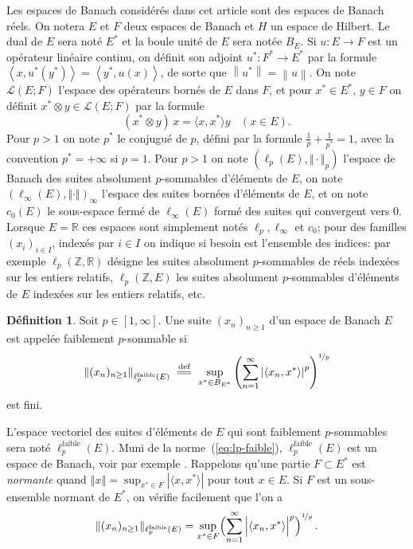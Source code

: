 \documentclass{smfart}
\theoremstyle{plain}
\theoremstyle{definition}
\newtheorem{definition}[theorem]{Définition}
\newcommand\Z{{\mathbb Z}}
\newcommand\R{{\mathbb R}}
\newcommand {\FAIBLE} {\text{faible}}
\newcommand {\defequal} {\; \overset{\text{def}}{=\joinrel=} \;}
\newcommand {\BOUNDED} {{\mathcal L}}
\begin{document}
 Les espaces de Banach considérés dans cet article
 sont des espaces de Banach réels. On notera $E $ et $F$ deux espaces
 de Banach et $H$ un espace de Hilbert. Le dual de $E$ sera noté $E^*$
 et la boule unité de $E$ sera notée $B_E$.  Si $u:E \to F$ est un
 opérateur linéaire continu, on définit son adjoint $u^*:F^* \to E^*$
 par la formule $\left\langle x,u^*(y^*)\right\rangle=\left\langle
   y^*,u(x)\right\rangle$, de sorte que
 $\left\|u^*\right\|=\left\|u\right\|$. On note $\BOUNDED(E; F)$
 l'espace des opérateurs bornés de $E$ dans $F$, et pour $x^*\in E^*$,
 $y \in F$ on définit $x^*{\otimes} y \in \BOUNDED(E; F)$ par la
 formule
\[
    (x^*{{\otimes}} y) \, x=\langle x,x^* \rangle y \ \ \ \ (x\in E).
\]
Pour $p > 1$ on note $p^*$ le conjugué de $p$, défini par la formule
$\frac{1}{p}+\frac{1}{p^*}=1$, avec la convention $p^*=+\infty$ si
$p=1$. Pour $p>1$ on note $(\ell_p(E), \Vert \cdot \Vert_p)$ l'espace de Banach
des suites absolument $p$-sommables d'éléments de $E$, on note 
$(\ell_{\infty}(E),\Vert \cdot \Vert)_{\infty}$  l'espace  des suites
bornées d'éléments de $E$, et on note $c_0(E)$ le sous-espace fermé de
$\ell_{\infty}(E)$ formé des suites qui convergent vers $0$. Lorsque
$E=\mathbb{R}$ ces espaces sont simplement notés $\ell_p, 
\ell_{\infty}$ et $c_0$; pour des familles $(x_i)_{i\in I}$, indexés
par $i \in I$ on indique si besoin est l'ensemble des indices: par exemple
$\ell_{p}(\Z,\R)$ désigne  les suites absolument $p$-sommables de réels indexées sur les entiers relatifs,
$\ell_{p}(\Z,  E)$ les suites absolument $p$-sommables d'éléments de $E$ indexées sur les entiers
relatifs, etc.

\begin{definition}\label{def:weak-lp}
  Soit $p \in [1, \infty]$. Une suite $(x_n)_{n\ge 1}$ d'un espace de
  Banach $E$ est appelée faiblement $p$-sommable si
\begin{equation}\label{eq:lp-faible}
  \left\|(x_n)_{n\ge 1}\right\|_{\ell_p^\FAIBLE(E)}    \defequal    \sup_{x^*\in B_{E^*}}\left(\sum_{n=1}^\infty\left|\left\langle x_n,x^*\right\rangle\right|^p\right)^{\nicefrac{1}{p}}
\end{equation}
est fini.
\end{definition}

\noindent L'espace vectoriel des suites d'éléments de $E$ qui sont
faiblement $p$-sommables sera noté $\ell_p^\FAIBLE(E)$. Muni de la
norme~(\ref{eq:lp-faible}), $\ell_p^\FAIBLE(E)$ est un espace de
Banach, voir par exemple \cite[page 32]{DJT}. Rappelons qu'une partie
$F\subset E^*$ est {\it normante} quand $\left \Vert x \right \Vert
=\sup_{x^*\in F}\left | \langle x,x^* \rangle \right |$ pour tout $x
\in E$. Si $F$ est un sous-ensemble normant de $E^*$, on vérifie
facilement que l'on a
\begin{equation} \label{lp-faible-via-normant}
  \Vert (x_n)_{n\ge 1}\Vert_{\ell_p^\FAIBLE(E)}=\sup_{x^*\in F}  \Bigl(\sum_{n=1}^\infty \left | \langle  x_n,x^* \rangle \Bigr | ^p\right )^{\nicefrac{1}{p}}.
\end{equation}
\end{document}
